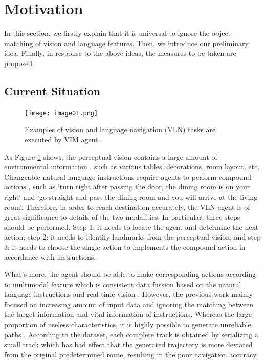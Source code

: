 \section{Motivation}
	
In this section, we firstly explain that it is universal to ignore the object matching of vision and language features. Then, we introduce our preliminary idea. Finally, in response to the above ideas, the measures to be taken are proposed.
\vspace{-1em}
\subsection{Current Situation}	

\begin{figure}[h]

	\centering
	\texttt{[image: image01.png]}
	\caption{Examples of vision and language navigation (VLN) tasks are executed by VIM agent.}
	\label{image01}
\end{figure}

As Figure \ref{image01} shows, the perceptual vision contains a large amount of environmental information \cite{huang2019transferable}, such as various tables, decorations, room layout, etc. Changeable natural language instructions require agents to perform compound actions \cite{majumdar2020improving}, such as `turn right after passing the door, the dining room is on your right` and `go straight and pass the dining room and you will arrive at the living room`. Therefore, in order to reach destination accurately, the VLN agent is of great significance to details of the two modalities. In particular, three steps should be performed. Step 1: it needs to locate the agent and determine the next action; step 2: it needs to identify landmarks from the perceptual vision; and step 3: it needs to choose the single action to implements the compound action in accordance with instructions.

What's more, the agent should be able to make corresponding actions according to multimodal feature which is consistent data fussion based on the natural language instructions and real-time vision \cite{qi2020object}. However, the previous work mainly focused on increasing amount of input data and ignoring the matching between the target information and vital information of instructions. Whereas the large proportion of useless characteristics, it is highly possible to generate unreliable paths \cite{ma2019regretful}. According to the dataset, each complete track is obtained by serializing a small track which has bad effect that the generated trajectory is more deviated from the original predetermined route, resulting in the poor navigation accuracy.
\vspace{-1em}
